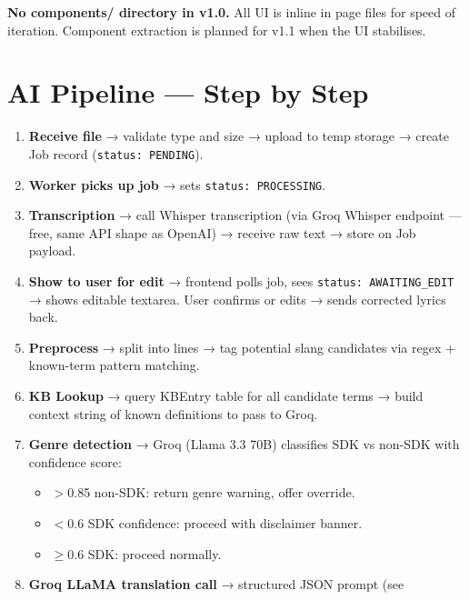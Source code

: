 \documentclass[12pt, a4paper]{article}
\begin{document}
\begin{tcolorbox}[warnbox]
  \textbf{No components/ directory in v1.0.} All UI is inline in page files
  for speed of iteration. Component extraction is planned for v1.1 when the
  UI stabilises.
\end{tcolorbox}

\section{AI Pipeline — Step by Step}

\begin{tcolorbox}[enginebox, title={Full Pipeline (Audio Upload Path)}]
\begin{enumerate}
  \item \textbf{Receive file} → validate type and size → upload to temp storage
        → create Job record (\texttt{status: PENDING}).
  \item \textbf{Worker picks up job} → sets \texttt{status: PROCESSING}.
  \item \textbf{Transcription} → call Whisper transcription (via Groq
        Whisper endpoint — free, same API shape as OpenAI) → receive
        raw text → store on Job payload.
  \item \textbf{Show to user for edit} → frontend polls job, sees
        \texttt{status: AWAITING\_EDIT} → shows editable textarea.
        User confirms or edits → sends corrected lyrics back.
  \item \textbf{Preprocess} → split into lines → tag potential slang
        candidates via regex + known-term pattern matching.
  \item \textbf{KB Lookup} → query KBEntry table for all candidate terms →
        build context string of known definitions to pass to Groq.
  \item \textbf{Genre detection} → Groq (Llama 3.3 70B) classifies SDK vs non-SDK with
        confidence score:
        \begin{itemize}
          \item $>$0.85 non-SDK: return genre warning, offer override.
          \item $<$0.6 SDK confidence: proceed with disclaimer banner.
          \item $\geq$0.6 SDK: proceed normally.
        \end{itemize}
  \item \textbf{Groq LLaMA translation call} → structured JSON prompt (see

\end{enumerate}
\end{tcolorbox}
\end{document}

